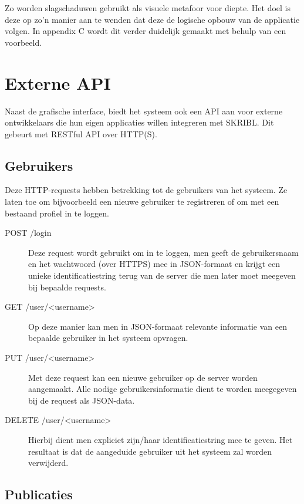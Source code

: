 \documentclass{article}
\begin{document}
Zo worden slagschaduwen gebruikt als visuele metafoor voor diepte. Het doel is deze op zo’n manier aan te wenden dat deze de logische opbouw van de applicatie volgen. In appendix C wordt dit verder duidelijk gemaakt met behulp van een voorbeeld.

\clearpage


\section{Externe API}
\label{api}

Naast de grafische interface, biedt het systeem ook een API aan voor externe ontwikkelaars die hun eigen applicaties willen integreren met SKRIBL. Dit gebeurt met RESTful API over HTTP(S).

\subsection{Gebruikers}

Deze HTTP-requests hebben betrekking tot de gebruikers van het systeem. Ze laten toe om bijvoorbeeld een nieuwe gebruiker te registreren of om met een bestaand profiel in te loggen.

\begin{description}

\item[POST /login] Deze request wordt gebruikt om in te loggen, men geeft de gebruikersnaam en het wachtwoord (over HTTPS) mee in JSON-formaat en krijgt een unieke identificatiestring terug van de server die men later moet meegeven bij bepaalde requests.

\item[GET /user/<username>] Op deze manier kan men in JSON-formaat relevante informatie van een bepaalde gebruiker in het systeem opvragen.

\item[PUT /user/<username>] Met deze request kan een nieuwe gebruiker op de server worden aangemaakt. Alle nodige gebruikersinformatie dient te worden meegegeven bij de request als JSON-data.

\item[DELETE /user/<username>] Hierbij dient men expliciet zijn/haar identificatiestring mee te geven. Het resultaat is dat de aangeduide gebruiker uit het systeem zal worden verwijderd.

\end{description}

\subsection{Publicaties} 
\end{document}
